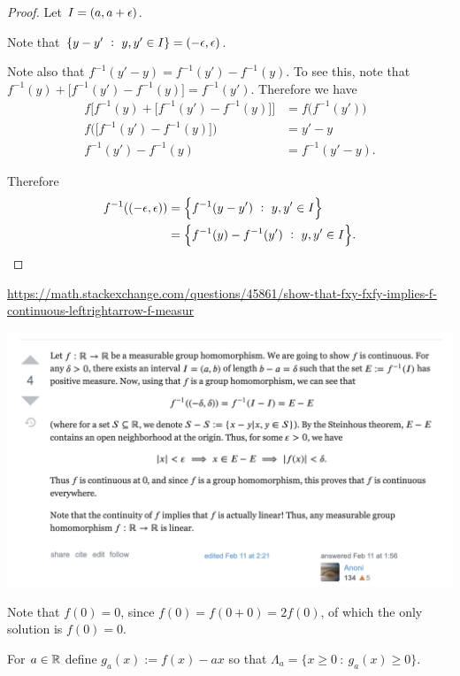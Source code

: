 \begin{proof}
  Let $I = (a, a + \epsilon)$.

  Note that $\{y - y' ~:~ y, y' \in I\} = (-\epsilon, \epsilon)$.

  Note also that $f^{-1}(y' - y) = f^{-1}(y') - f^{-1}(y)$. To see this, note
  that $f^{-1}(y) + \big[f^{-1}(y') - f^{-1}(y)\big] = f^{-1}(y')$. Therefore we have
  \begin{align*}
    f\Big[f^{-1}(y) + \big[f^{-1}(y') - f^{-1}(y)\big]\Big] &= f\big(f^{-1}(y')\big) \\
    f\Big(\big[f^{-1}(y') - f^{-1}(y)\big]\Big) &= y' - y \\
    f^{-1}(y') - f^{-1}(y) &= f^{-1}(y' - y).
  \end{align*}

  Therefore
  \begin{align*}
    f^{-1}((-\epsilon, \epsilon))
    &= \Big\{f^{-1}(y - y') ~:~ y, y' \in I\Big\} \\
    &= \Big\{f^{-1}(y) - f^{-1}(y') ~:~ y, y' \in I\Big\}.
  \end{align*}
\end{proof}


\url{https://math.stackexchange.com/questions/45861/show-that-fxy-fxfy-implies-f-continuous-leftrightarrow-f-measur}

\begin{mdframed}
\includegraphics[width=400pt]{img/analysis--berkeley-202a-hw06-e247.png}
\end{mdframed}

Note that $f(0) = 0$, since $f(0) = f(0 + 0) = 2f(0)$, of which the only solution is $f(0) = 0$.

For $a \in \mathbb{R}$ define $g_a(x) := f(x) - ax$ so that $\Lambda_a = \{x \geq 0 ~:~ g_a(x) \geq 0\}$.

